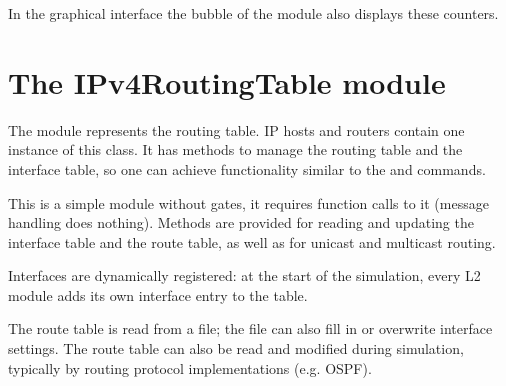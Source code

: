In the graphical interface the bubble of the  module
also displays these counters.


\section{The IPv4RoutingTable module}

The  module represents the routing table.
IP hosts and routers contain one instance of this class. It has
methods to manage the routing table and the interface table,
so one can achieve functionality similar to the  and
 commands.

This is a simple module without gates, it requires function calls to it
(message handling does nothing). Methods are provided for reading and
updating the interface table and the route table, as well as for unicast
and multicast routing.

Interfaces are dynamically registered: at the start of the simulation,
every L2 module adds its own interface entry to the table.

The route table is read from a file; the file can
also fill in or overwrite interface settings. The route table can also
be read and modified during simulation, typically by routing protocol
implementations (e.g. OSPF).

